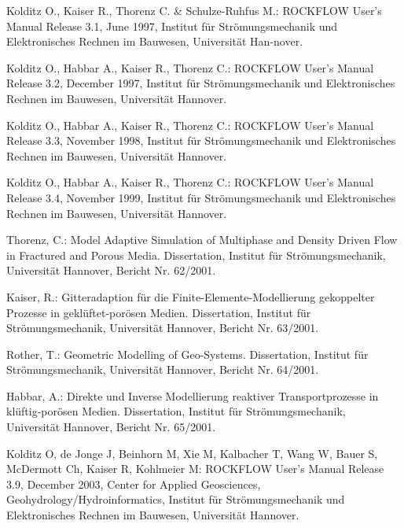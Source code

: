 \begin{list}{}{\setlength{\itemindent}{-.5cm}}
\item Kolditz O., Kaiser R., Thorenz C. \& Schulze-Ruhfus M.: ROCKFLOW User's Manual Release 3.1,
  June 1997, Institut f\"{u}r Str\"{o}\-mungs\-mechanik und Elektronisches Rechnen im Bauwesen, Universit\"{a}t Han-nover.

\item Kolditz O., Habbar A., Kaiser R., Thorenz C.: ROCKFLOW User's Manual Release 3.2,
  December 1997, Institut f\"{u}r Str\"{o}\-mungs\-mechanik und Elektronisches Rechnen im Bauwesen, Universit\"{a}t Hannover.

\item Kolditz O., Habbar A., Kaiser R., Thorenz C.: ROCKFLOW User's Manual Release 3.3,
  November 1998, Institut f\"{u}r Str\"{o}\-mungs\-mechanik und Elektronisches Rechnen im Bauwesen, Universit\"{a}t Hannover.

\item Kolditz O., Habbar A., Kaiser R., Thorenz C.: ROCKFLOW User's Manual Release 3.4,
  November 1999, Institut f\"{u}r Str\"{o}\-mungs\-mechanik und Elektronisches Rechnen im Bauwesen, Universit\"{a}t Hannover.

\item Thorenz, C.: Model Adaptive Simulation of Multiphase and Density Driven Flow in
    Fractured and Porous Media. Dissertation, Institut f\"{u}r Str\"{o}\-mungs\-mechanik, Universit\"{a}t
    Hannover, Bericht Nr. 62/2001.

\item Kaiser, R.: Gitteradaption f\"{u}r die Finite-Elemente-Modellierung gekoppelter Prozesse in
    gekl\"{u}ftet-por\"{o}sen Medien. Dissertation, Institut f\"{u}r Str\"{o}\-mungs\-mechanik, Universit\"{a}t
    Hannover, Bericht Nr. 63/2001.

\item Rother, T.: Geometric Modelling of Geo-Systems. Dissertation, Institut f\"{u}r
    Str\"{o}\-mungs\-mechanik, Universit\"{a}t Hannover, Bericht Nr. 64/2001.

\item Habbar, A.: Direkte und Inverse Modellierung reaktiver Transportprozesse in kl\"{u}ftig-por\"{o}sen Medien.
  Dissertation, Institut f\"{u}r Str\"{o}\-mungs\-mechanik, Universit\"{a}t Hannover, Bericht Nr. 65/2001.

\item Kolditz O, de Jonge J, Beinhorn M, Xie M, Kalbacher T, Wang W, Bauer S, McDermott Ch,
  Kaiser R, Kohlmeier M: ROCKFLOW User's Manual Release 3.9,
  December 2003, Center for Applied Geosciences, Geohydrology/Hydroinformatics,
  Institut f\"{u}r Str\"{o}\-mungs\-mechanik und Elektronisches Rechnen im Bauwesen, Universit\"{a}t Hannover.

\item
\end{list}

